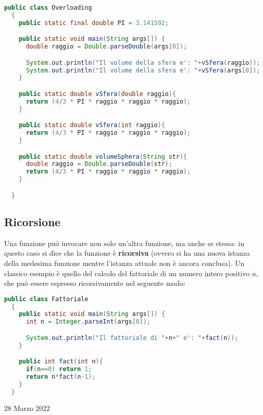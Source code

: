 \documentclass[a4paper]{extarticle}
\begin{document}
\vspace{1em}
\noindent
\begin{lstlisting}[language=Java, caption=Overloading in Java]
  public class Overloading
  {
    public static final double PI = 3.141592;

    public static void main(String args[]) {
      double raggio = Double.parseDouble(args[0]);

      System.out.println("Il volume della sfera e': "+vSfera(raggio));
      System.out.println("Il volume della sfera e': "+vSfera(args[0]);
    }

    public static double vSfera(double raggio){
      return (4/3 * PI * raggio * raggio * raggio);
    }

    public static double vSfera(int raggio){
      return (4/3 * PI * raggio * raggio * raggio);
    }

    public static double volumeSphera(String str){
      double raggio = Double.parseDouble(str);
      return (4/3 * PI * raggio * raggio * raggio);
    }

  }
\end{lstlisting}

\vspace{1em}
\subsection{Ricorsione}
Una funzione può invocare non solo un’altra funzione, ma anche se stessa: in questo caso si dice che la funzione è \textbf{ricorsiva} (ovvero si ha una nuova istanza della medesima funzione mentre l’istanza attuale non è ancora conclusa).
Un classico esempio è quello del calcolo del fattoriale di un numero intero positivo $n$, che può essere espresso ricorsivamente nel seguente modo:

\newpage
\noindent
\begin{lstlisting}[language=Java, caption=Funzione ricorsiva in Java]
  public class Fattoriale
  {
    public static void main(String args[]) {
      int n = Integer.parseInt(args[0]);

      System.out.println("Il fattoriale di "+n+" e': "+fact(n));
    }

    public int fact(int n){
      if(n==0) return 1;
      return n*fact(n-1);
    }
  }
\end{lstlisting}

\newpage
\noindent
\begin{center}
  28 Marzo 2022
\end{center}
\end{document}
